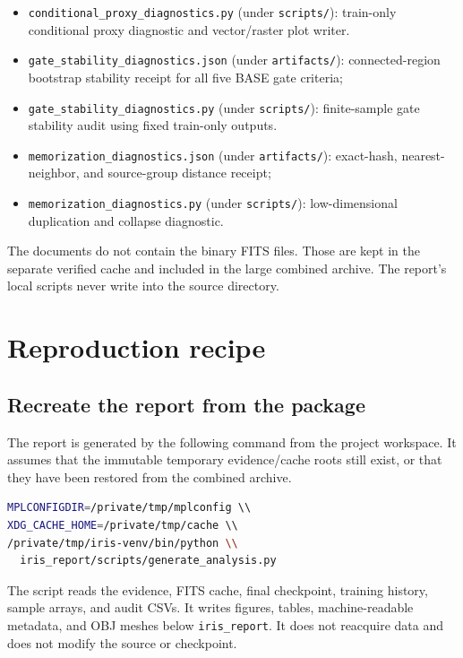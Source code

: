 \documentclass[11pt,oneside]{report}
\begin{document}
\begin{itemize}
\item \texttt{conditional\_proxy\_diagnostics.py} (under \texttt{scripts/}): train-only conditional proxy diagnostic and vector/raster plot writer.
\item \texttt{gate\_stability\_diagnostics.json} (under \texttt{artifacts/}): connected-region bootstrap stability receipt for all five BASE gate criteria;
\item \texttt{gate\_stability\_diagnostics.py} (under \texttt{scripts/}): finite-sample gate stability audit using fixed train-only outputs.
\item \texttt{memorization\_diagnostics.json} (under \texttt{artifacts/}): exact-hash, nearest-neighbor, and source-group distance receipt;
\item \texttt{memorization\_diagnostics.py} (under \texttt{scripts/}): low-dimensional duplication and collapse diagnostic.
\end{itemize}

The documents do not contain the binary FITS files. Those are kept in the separate verified cache and included in the large combined archive. The report’s local scripts never write into the source directory.

\chapter{Reproduction recipe}

\section{Recreate the report from the package}

The report is generated by the following command from the project workspace. It assumes that the immutable temporary evidence/cache roots still exist, or that they have been restored from the combined archive.

\begin{lstlisting}[language=bash]
MPLCONFIGDIR=/private/tmp/mplconfig \\
XDG_CACHE_HOME=/private/tmp/cache \\
/private/tmp/iris-venv/bin/python \\
  iris_report/scripts/generate_analysis.py
\end{lstlisting}

The script reads the evidence, FITS cache, final checkpoint, training history, sample arrays, and audit CSVs. It writes figures, tables, machine-readable metadata, and OBJ meshes below \texttt{iris\_report}. It does not reacquire data and does not modify the source or checkpoint.
\end{document}

